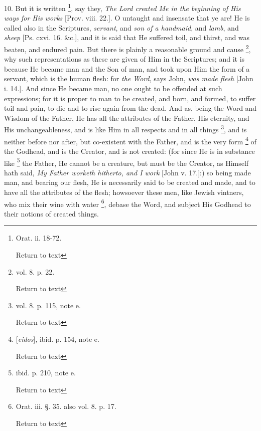 10. But it is written \footnote{Orat. ii. 18-72.

Return to text}, say they, \emph{The Lord created Me in the beginning of His ways for
His works} [Prov. viii. 22.]. O untaught and insensate that ye are!
He is called also in the Scriptures, \emph{servant}, and \emph{son of a
handmaid}, and \emph{lamb}, and \emph{sheep} [Ps. cxvi. 16.
\&c.], and it is said that He suffered toil, and thirst, and was
beaten, and endured pain. But there is plainly a reasonable ground and
cause \footnote{vol. 8. p. 22.

Return to text}, why such representations as
these are given of Him in the Scriptures; and it is because He became
man and the Son of man, and took upon Him the form of a servant, which
is the human flesh: for \emph{the Word}, says John, \emph{was made flesh}
[John i. 14.]. And since He became man, no one ought to be offended at
such expressions; for it is proper to man to be created, and born, and
formed, to suffer toil and pain, to die and to rise again from the
dead. And as, being the Word and Wisdom of the Father, He has all the
attributes of the Father, His eternity, and His unchangeableness, and
is like Him in all respects and in all things \footnote{vol. 8. p. 115, note e.

Return to text}, and is neither before nor after, but co-existent with the Father,
and is the very form \footnote{[\emph{eidos}], ibid. p. 154, note e.

Return to text} of the Godhead,
and is the Creator, and is not created: (for since He is in substance
like \footnote{ibid. p. 210, note e.

Return to text} the Father, He cannot be a
creature, but must be the Creator, as Himself hath said, \emph{My Father
worketh hitherto, and I work} [John v. 17.]:) so being made man,
and bearing our flesh, He is necessarily said to be created and
made, and to have all the attributes of the flesh; howsoever these
men, like Jewish vintners, who mix their wine with water \footnote{Orat. iii. §. 35. also vol. 8. p. 17.

Return to text}, debase the Word, and subject His Godhead to their notions of
created things.

